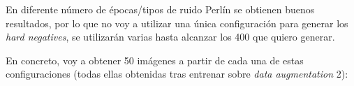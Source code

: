 \begin{figure}[H]
\centering
\end{figure}

En diferente número de épocas/tipos de ruido Perlín se obtienen buenos resultados, por lo que no voy a utilizar una única configuración para generar los \textit{hard negatives}, se utilizarán varias hasta alcanzar los 400 que quiero generar. 

En concreto, voy a obtener 50 imágenes a partir de cada una de estas configuraciones (todas ellas obtenidas tras entrenar sobre \textit{data augmentation} 2):

